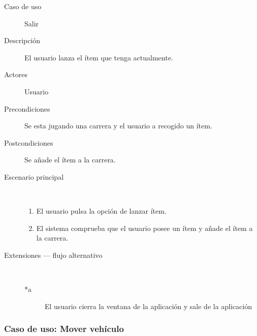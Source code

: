 \begin{description}
    \item[Caso de uso] Salir
    \item[Descripción] El usuario lanza el ítem que tenga actualmente.
    \item[Actores] Usuario
    \item[Precondiciones] Se esta jugando una carrera y el usuario a recogido un ítem.
    \item[Postcondiciones] Se añade el ítem a la carrera.
    \item[Escenario principal] $\quad$
        \begin{enumerate}
            \item El usuario pulsa la opción de lanzar ítem.
            \item El sistema comprueba que el usuario posee un ítem y añade el ítem a la carrera.
        \end{enumerate}
    \item[Extensiones --- flujo alternativo] $\quad$
        \begin{description}
            \item[*a ] El usuario cierra la ventana de la aplicación y sale de la aplicación
        \end{description}
\end{description}

\subsubsection{Caso de uso: Mover vehículo}

